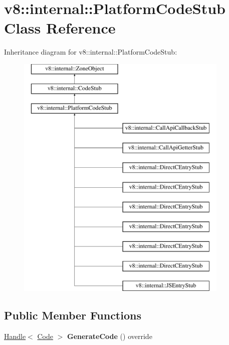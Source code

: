 \hypertarget{classv8_1_1internal_1_1PlatformCodeStub}{}\section{v8\+:\+:internal\+:\+:Platform\+Code\+Stub Class Reference}
\label{classv8_1_1internal_1_1PlatformCodeStub}
Inheritance diagram for v8\+:\+:internal\+:\+:Platform\+Code\+Stub\+:\begin{figure}[H]
\begin{center}
\leavevmode
\includegraphics[height=12.000000cm]{classv8_1_1internal_1_1PlatformCodeStub}
\end{center}
\end{figure}
\subsection*{Public Member Functions}
\begin{DoxyCompactItemize}
\item 
\mbox{\label{classv8_1_1internal_1_1PlatformCodeStub_ae469c434536ffe2754b075a0a6956733}} 
\mbox{\hyperlink{classv8_1_1internal_1_1Handle}{Handle}}$<$ \mbox{\hyperlink{classv8_1_1internal_1_1Code}{Code}} $>$ {\bfseries Generate\+Code} () override
\end{DoxyCompactItemize}
